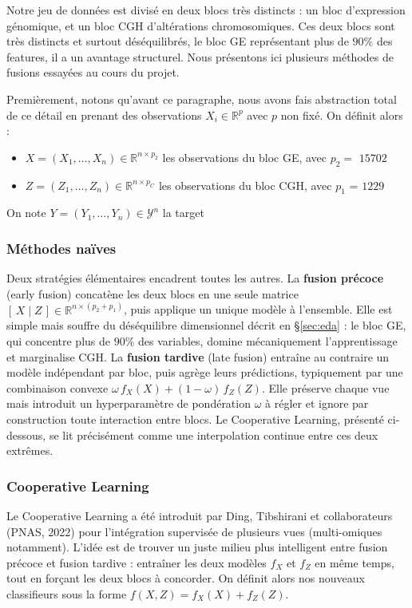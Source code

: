 \documentclass[a4paper,11pt]{paper}
\theoremstyle{plain}
\theoremstyle{definition}
\theoremstyle{remark}
\begin{document}
Notre jeu de données est divisé en deux blocs très distincts : un bloc d'expression génomique, et un bloc CGH d'altérations chromosomiques. Ces deux blocs sont très distincts et surtout déséquilibrés, le bloc GE représentant plus de $90\%$ des features, il a un avantage structurel. Nous présentons ici plusieurs méthodes de fusions essayées au cours du projet.

Premièrement, notons qu'avant ce paragraphe, nous avons fais abstraction total de ce détail en prenant des observations $X_i \in \mathbb R^p$ avec $p$ non fixé. On définit alors :
\begin{itemize}
    \item $X = (X_1, \dots, X_n) \in \mathbb R^{n \times p_2}$ les observations du bloc GE, avec $p_2 = $ $15702$
    \item $Z = (Z_1, \dots, Z_n) \in \mathbb R^{n \times p_C}$ les observations du bloc CGH, avec $p_1$ = $1229$
\end{itemize}
On note $Y  = (Y_1, \dots, Y_n) \in \mathcal Y^n$ la target


\subsubsection{Méthodes naïves}

Deux stratégies élémentaires encadrent toutes les autres. La \textbf{fusion précoce} (early fusion) concatène les deux blocs en une seule matrice $[\,X \mid Z\,] \in \mathbb{R}^{n \times (p_2 + p_1)}$, puis applique un unique modèle à l'ensemble. Elle est simple mais souffre du déséquilibre dimensionnel décrit en §\ref{sec:eda} : le bloc GE, qui concentre plus de $90\%$ des variables, domine mécaniquement l'apprentissage et marginalise CGH. La \textbf{fusion tardive} (late fusion) entraîne au contraire un modèle indépendant par bloc, puis agrège leurs prédictions, typiquement par une combinaison convexe $\omega\, f_X(X) + (1-\omega)\, f_Z(Z)$. Elle préserve chaque vue mais introduit un hyperparamètre de pondération $\omega$ à régler et ignore par construction toute interaction entre blocs. Le Cooperative Learning, présenté ci-dessous, se lit précisément comme une interpolation continue entre ces deux extrêmes.

\subsubsection{Cooperative Learning}

Le Cooperative Learning a été introduit par Ding, Tibshirani et collaborateurs (PNAS, 2022) pour l'intégration supervisée de plusieurs vues (multi-omiques notamment). L'idée est de trouver un juste milieu plus intelligent entre fusion précoce et fusion tardive : entraîner les deux modèles $f_X$ et $f_Z$ en même temps, tout en forçant les deux blocs à concorder. On définit alors nos nouveaux classifieurs sous la forme $f(X, Z) = f_X(X) + f_Z(Z)$.
\end{document}
